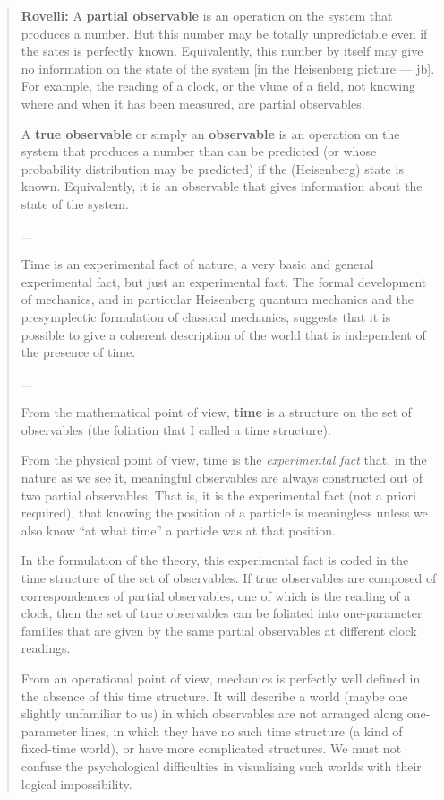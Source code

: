 \documentclass{article}
\begin{document}
\begin{quote}
\textbf{Rovelli:} A \textbf{partial observable} is an operation on the
system that produces a number. But this number may be totally
unpredictable even if the sates is perfectly known. Equivalently, this
number by itself may give no information on the state of the system
{[}in the Heisenberg picture --- jb{]}. For example, the reading of a
clock, or the vluae of a field, not knowing where and when it has been
measured, are partial observables.

A \textbf{true observable} or simply an \textbf{observable} is an
operation on the system that produces a number than can be predicted (or
whose probability distribution may be predicted) if the (Heisenberg)
state is known. Equivalently, it is an observable that gives information
about the state of the system.

\ldots.

Time is an experimental fact of nature, a very basic and general
experimental fact, but just an experimental fact. The formal development
of mechanics, and in particular Heisenberg quantum mechanics and the
presymplectic formulation of classical mechanics, suggests that it is
possible to give a coherent description of the world that is independent
of the presence of time.

\ldots.

From the mathematical point of view, \textbf{time} is a structure on the
set of observables (the foliation that I called a time structure).

From the physical point of view, time is the \emph{experimental fact}
that, in the nature as we see it, meaningful observables are always
constructed out of two partial observables. That is, it is the
experimental fact (not a priori required), that knowing the position of
a particle is meaningless unless we also know ``at what time'' a
particle was at that position.

In the formulation of the theory, this experimental fact is coded in the
time structure of the set of observables. If true observables are
composed of correspondences of partial observables, one of which is the
reading of a clock, then the set of true observables can be foliated
into one-parameter families that are given by the same partial
observables at different clock readings.

From an operational point of view, mechanics is perfectly well defined
in the absence of this time structure. It will describe a world (maybe
one slightly unfamiliar to us) in which observables are not arranged
along one-parameter lines, in which they have no such time structure (a
kind of fixed-time world), or have more complicated structures. We must
not confuse the psychological difficulties in visualizing such worlds
with their logical impossibility.


\end{quote}
\end{document}
